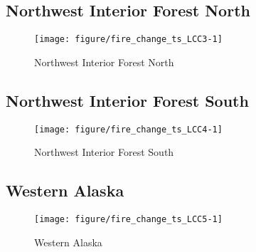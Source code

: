\documentclass{article}\usepackage[]{graphicx}\usepackage[]{color}
\makeatletter
\def\maxwidth{ %
  \ifdim\Gin@nat@width>\linewidth
    \linewidth
  \else
    \Gin@nat@width
  \fi
}
\makeatother
\begin{document}
\subsection{Northwest Interior Forest North}
\begin{figure}[H]
\texttt{[image: figure/fire\_change\_ts\_LCC3-1]} \caption[Northwest Interior Forest North]{Northwest Interior Forest North\label{fig:fire_change_ts_LCC3}}
\end{figure}



\subsection{Northwest Interior Forest South}
\begin{figure}[H]
\texttt{[image: figure/fire\_change\_ts\_LCC4-1]} \caption[Northwest Interior Forest South]{Northwest Interior Forest South\label{fig:fire_change_ts_LCC4}}
\end{figure}



\subsection{Western Alaska}
\begin{figure}[H]
\texttt{[image: figure/fire\_change\_ts\_LCC5-1]} \caption[Western Alaska]{Western Alaska\label{fig:fire_change_ts_LCC5}}
\end{figure}
\end{document}
